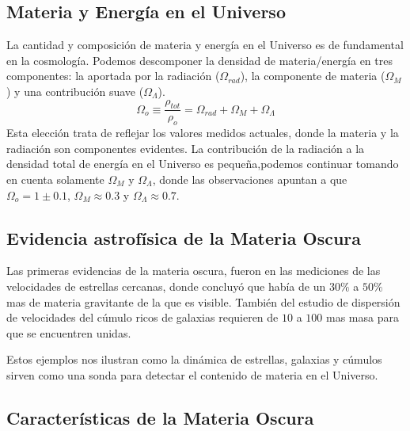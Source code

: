 \documentclass{beamer}
\begin{document}
\subsection{Materia y Energía en el Universo}
	\begin{frame}
		La cantidad y composición de materia y energía en el Universo es de fundamental en la cosmología. Podemos descomponer la densidad de materia/energía en tres componentes: la aportada por la radiación ($\Omega_{rad}$), la componente de materia ($\Omega_{M}$) y una contribución suave ($\Omega_{\Lambda}$).		
		\begin{equation}
			\Omega_o \equiv \frac{\rho_{tot}}{\rho_o} = \Omega_{rad} + \Omega_M + \Omega_{\Lambda}
		\end{equation}
Esta elección trata de reflejar los valores medidos actuales, donde la materia y la radiación son componentes evidentes. La contribución de la radiación a la densidad total de energía en el Universo es pequeña,podemos continuar tomando en cuenta solamente $\Omega_{M}$ y $\Omega_{\Lambda}$, donde las observaciones apuntan a que $\Omega_{o}=1\pm 0.1$, $\Omega_{M}\approx 0.3$ y $\Omega_{\Lambda}\approx 0.7$.
	\end{frame}
	

\subsection{Evidencia astrofísica de la Materia Oscura}
	\begin{frame}
		Las primeras evidencias de la materia oscura, fueron en las mediciones de las velocidades de estrellas cercanas, donde concluyó que había de un $30\%$ a $50\%$ mas de materia gravitante de la que es visible. También del estudio de dispersión de velocidades del cúmulo ricos de galaxias requieren de $10$ a $100$ mas masa para que se encuentren unidas. 
		
		Estos ejemplos nos ilustran como la dinámica de estrellas, galaxias y cúmulos sirven como una sonda para detectar el contenido de materia en el Universo.


	\end{frame}
\subsection{Características de la Materia Oscura}
\end{document}
